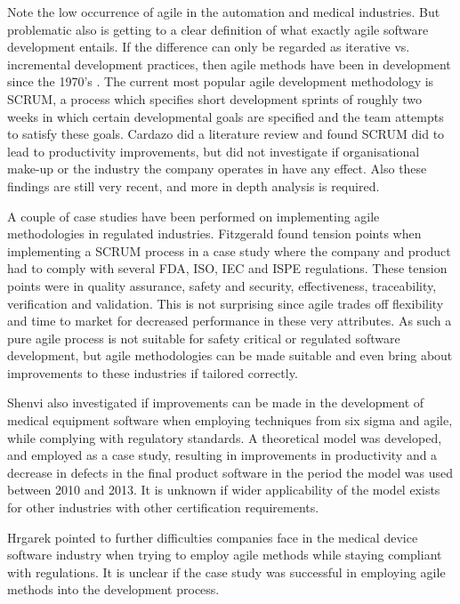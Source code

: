 \documentclass{sig-alternate-05-2015}
\begin{document}
Note the low occurrence of agile in the automation and medical industries. But problematic also is getting to a clear definition of what exactly agile software development entails. If the difference can only be regarded as iterative vs. incremental development practices, then agile methods have been in development since the 1970's \cite{Larman_2003}. The current most popular agile development methodology is SCRUM, a process which specifies short development sprints of roughly two weeks in which certain developmental goals are specified and the team attempts to satisfy these goals. Cardazo \cite{Cardozo_2010} did a literature review and found SCRUM did to lead to productivity improvements, but did not investigate if organisational make-up or the industry the company operates in have any effect. Also these findings are still very recent, and more in depth analysis is required.   

A couple of case studies have been performed on implementing agile methodologies in regulated industries. Fitzgerald \cite{Fitzgerald_2013} found tension points when implementing a SCRUM process in a case study where the company and product had to comply with several FDA, ISO, IEC and ISPE regulations. These tension points were in quality assurance, safety and security, effectiveness, traceability, verification and validation. This is not surprising since agile trades off flexibility and time to market for decreased performance in these very attributes. As such a pure agile process is not suitable for safety critical or regulated software development, but agile methodologies can be made suitable and even bring about improvements to these industries if tailored correctly. 

Shenvi \cite{Shenvi_2014} also investigated if improvements can be made in the development of medical equipment software when employing techniques from six sigma and agile, while complying with regulatory standards. A theoretical model was developed, and employed as a case study, resulting in improvements in productivity and a decrease in defects in the final product software in the period the model was used between 2010 and 2013. It is unknown if wider applicability of the model exists for other industries with other certification requirements. 

Hrgarek \cite{Hrgarek_2012} pointed to further difficulties companies face in the medical device software industry when trying to employ agile methods while staying compliant with regulations. It is unclear if the case study was successful in employing agile methods into the development process.
\end{document}
